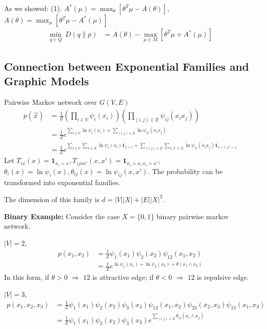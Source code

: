 \documentclass[11pt,a4paper]{article}
\begin{document}
As we showed: (1). $A^*(\mu)=\max_\theta [\theta^T\mu- A(\theta)]$, $A(\theta)=\max_\mu [\theta^T\mu-A^*(\mu)]$
\begin{equation}
    \begin{aligned}
        \min_{q\in Q}\ D(q\| p)&=A(\theta)-\max_{\mu\in M}\left[\theta^T \mu +A^*(\mu)\right]
    \end{aligned}
    \nonumber
\end{equation}


\subsection{Connection between Exponential Families and Graphic Models}

Pairwise Markov network over $G(V,E)$
\begin{equation}
    \begin{aligned}
        p(\vec{x})&=\frac{1}{Z}\left(\prod_{i\in V}\psi_i(x_i)\right)\left(\prod_{(i,j)\in E}\psi_{ij}(x_ix_j)\right)\\
        &=\frac{1}{Z}e^{\sum_{i\in V}\ln \psi_i(x_i)+\sum_{(i,j)\in E}\ln \psi_{ij}(x_ix_j)}\\
        &=\frac{1}{Z}e^{\sum_{i\in V}\sum_{x\in X}\ln \psi_i(x_i) \mathbf{1}_{x=i}+\sum_{(i,j)\in E}\sum_{x,x'\in X}\ln \psi_{ij}(x_ix_j)\mathbf{1}_{x=i,x'=j}}
    \end{aligned}
    \nonumber
\end{equation}
Let $T_{ix}(x)=\mathbf{1}_{x_i=x},T_{ijxx'}(x,x')=\mathbf{1}_{x_i=x,x_i=x'}$, $\theta_i(x)=\ln\psi_i(x), \theta_{ij}(x)=\ln\psi_{ij}(x,x')$. The probability can be transformed into exponential families.

The dimension of this family is $d = |V||X| + |E||X|^2$.

\textbf{Binary Example:} Consider the case $X=\{0,1\}$ binary pairwise markov network.

$|V|=2$,
\begin{equation}
    \begin{aligned}
        p(x_1,x_2)&=\frac{1}{Z}\psi_1(x_1)\psi_2(x_2)\psi_{12}(x_1,x_2)\\
        &=\frac{1}{Z}e^{\ln \psi_1(x_1)+\ln \psi_2(x_2) +\theta (x_1\land x_2)}
    \end{aligned}
    \nonumber
\end{equation}
In this form, if $\theta>0$ $\Rightarrow$ $12$ is attractive edge; if $\theta<0$ $\Rightarrow$ $12$ is repulsive edge.

$|V|=3$,
\begin{equation}
    \begin{aligned}
        p(x_1,x_2,x_3)&=\frac{1}{Z}\psi_1(x_1)\psi_2(x_2)\psi_3(x_3)\psi_{12}(x_1,x_2)\psi_{23}(x_2,x_3)\psi_{13}(x_1,x_3)\\
        &=\frac{1}{Z}\psi_1(x_1)\psi_2(x_2)\psi_3(x_3)e^{\sum_{(i,j)\in E}\theta_{ij} (x_i\land x_j)}
    \end{aligned}
    \nonumber
\end{equation}
\end{document}
